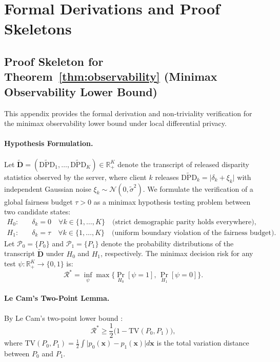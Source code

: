\documentclass[preprint,12pt]{elsarticle}
\theoremstyle{plain}
\theoremstyle{definition}
\theoremstyle{remark}
\newcommand{\dpd}{\mathrm{DPD}}
\begin{document}
\appendix
\section{Formal Derivations and Proof Skeletons}
\label{sec:appendix_proofs}

\subsection{Proof Skeleton for Theorem~\ref{thm:observability} (Minimax Observability Lower Bound)}
\label{sec:appendix_lecam_proof}

This appendix provides the formal derivation and non-triviality verification for the minimax observability lower bound under local differential privacy.

\paragraph{Hypothesis Formulation.} Let $\widetilde{\bm{D}} = (\widetilde{\dpd}_1,\dots,\widetilde{\dpd}_K) \in \mathbb{R}_+^K$ denote the transcript of released disparity statistics observed by the server, where client $k$ releases $\widetilde{\dpd}_k = \lvert \delta_k + \xi_k \rvert$ with independent Gaussian noise $\xi_k \sim \mathcal{N}(0, \tilde\sigma^2)$. We formulate the verification of a global fairness budget $\tau > 0$ as a minimax hypothesis testing problem between two candidate states:
\begin{align}
H_0:&\quad \delta_k = 0 \quad \forall k \in \{1,\dots,K\} \quad \text{(strict demographic parity holds everywhere)}, \\
H_1:&\quad \delta_k = \tau \quad \forall k \in \{1,\dots,K\} \quad \text{(uniform boundary violation of the fairness budget)}.
\end{align}
Let $\mathcal{P}_0 = \{P_0\}$ and $\mathcal{P}_1 = \{P_1\}$ denote the probability distributions of the transcript $\widetilde{\bm{D}}$ under $H_0$ and $H_1$, respectively. The minimax decision risk for any test $\psi: \mathbb{R}_+^K \to \{0, 1\}$ is:
\begin{equation}
\mathcal{R}^* = \inf_\psi \max\big\{\Pr_{H_0}[\psi = 1],\,\Pr_{H_1}[\psi = 0]\big\}.
\end{equation}

\paragraph{Le Cam's Two-Point Lemma.} By Le Cam's two-point lower bound \cite{lecam1973convergence,tsybakov2009nonparametric}:
\begin{equation}
\mathcal{R}^* \ge \frac{1}{2}\big(1 - \mathrm{TV}(P_0, P_1)\big),
\label{eq:app_lecam_tv}
\end{equation}
where $\mathrm{TV}(P_0, P_1) = \frac{1}{2}\int \lvert p_0(\bm{x}) - p_1(\bm{x}) \rvert d\bm{x}$ is the total variation distance between $P_0$ and $P_1$.
\end{document}
